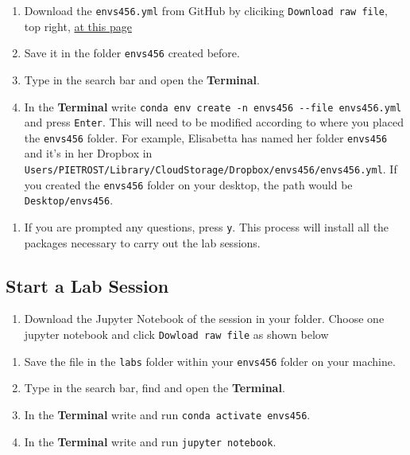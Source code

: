 \documentclass[
  letterpaper,
  DIV=11,
  numbers=noendperiod]{scrreprt}
\providecommand{\tightlist}{%
  \setlength{\itemsep}{0pt}\setlength{\parskip}{0pt}}\usepackage{longtable,booktabs,array}
\begin{document}
\begin{enumerate}
\def\labelenumi{\arabic{enumi}.}
\tightlist
\item
  Download the \texttt{envs456.yml} from GitHub by cliciking
  \texttt{Download\ raw\ file}, top right,
  \href{https://github.com/GDSL-UL/wma/blob/main/envs456.yml}{at this
  page}
\item
  Save it in the folder \texttt{envs456} created before.
\item
  Type in the search bar and open the \textbf{Terminal}.
\item
  In the \textbf{Terminal} write
  \texttt{conda\ env\ create\ -n\ envs456\ -\/-file\ envs456.yml} and
  press \texttt{Enter}. This will need to be modified according to where
  you placed the \texttt{envs456} folder. For example, Elisabetta has
  named her folder \texttt{envs456} and it's in her Dropbox in
  \texttt{Users/PIETROST/Library/CloudStorage/Dropbox/envs456/envs456.yml}.
  If you created the \texttt{envs456} folder on your desktop, the path
  would be \texttt{Desktop/envs456}.
\end{enumerate}

\begin{enumerate}
\def\labelenumi{\arabic{enumi}.}
\setcounter{enumi}{3}
\tightlist
\item
  If you are prompted any questions, press \texttt{y}. This process will
  install all the packages necessary to carry out the lab sessions.
\end{enumerate}

\subsection*{Start a Lab Session}\label{start-a-lab-session-1}

\begin{enumerate}
\def\labelenumi{\arabic{enumi}.}
\tightlist
\item
  Download the Jupyter Notebook of the session in your folder. Choose
  one jupyter notebook and click \texttt{Dowload\ raw\ file} as shown
  below
\end{enumerate}

\begin{enumerate}
\def\labelenumi{\arabic{enumi}.}
\setcounter{enumi}{1}
\tightlist
\item
  Save the file in the \texttt{labs} folder within your \texttt{envs456}
  folder on your machine.
\item
  Type in the search bar, find and open the \textbf{Terminal}.
\item
  In the \textbf{Terminal} write and run
  \texttt{conda\ activate\ envs456}.
\item
  In the \textbf{Terminal} write and run \texttt{jupyter\ notebook}.
\end{enumerate}
\end{document}
